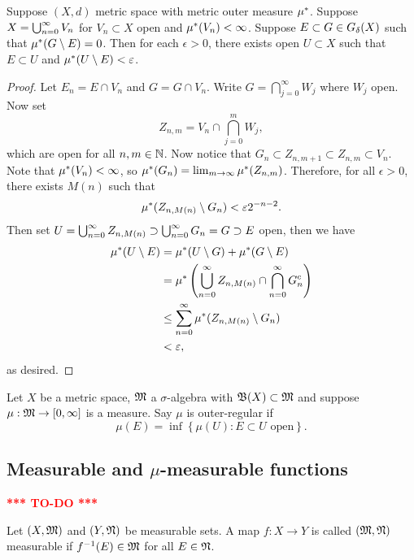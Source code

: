 \documentclass[a4paper]{article}
\begin{document}
\begin{lemma}
Suppose $(X, d)$ metric space with metric outer measure 
$\mu^*$. Suppose $X = \bigcup_{n=0}^\infty V_n$ for $V_n \subset X$ open and 
$\mu^*(V_n) < \infty$. Suppose $E \subset G \in G_\delta(X)$ such that 
$\mu^*(G \setminus E) = 0$. Then for each $\epsilon > 0$, 
there exists open $U \subset X$ such that $E \subset U$
and $\mu^*(U \setminus E) < \varepsilon$.  

\end{lemma}

\begin{proof}

Let $E_n = E \cap V_n$ and $G = G \cap V_n$. Write 
$G = \bigcap_{j=0}^\infty W_j$ where $W_j$ open. 
Now set 
\[
Z_{n, m} = V_n \cap \bigcap_{j=0}^m W_j,
\]
which are open for all $n, m \in \mathbb{N}$.
Now notice that $G_n \subset Z_{n, m+1} \subset Z_{n,m} 
\subset V_n$. Note that $\mu^*(V_n) < \infty$, so 
$\mu^*(G_n) = \lim_{m \to \infty} \mu^*(Z_{n, m})$. Therefore, 
for all $\epsilon > 0$, there exists $M(n)$ such that 
\[
\mu^*(Z_{n, M(n)} \setminus G_n) < \varepsilon 2^{-n-2}.
\]
Then set $U = \bigcup_{n=0}^\infty Z_{n, M(n)} \supset \bigcup_{n=0}^\infty G_n = G 
\supset E$ open, then we have 
\[
\begin{aligned}
\mu^*(U \setminus E) 
&= \mu^*(U \setminus G) + \mu^*(G \setminus E)  \\
&= \mu^* \left( \bigcup_{n=0}^\infty Z_{n, M(n)} \cap
\bigcap_{n=0}^\infty G_n^c \right) \\
&\leq \sum_{n=0}^\infty \mu^*(Z_{n, M(n)} \setminus G_n) \\
&< \varepsilon,
\end{aligned}
\]
as desired.

\end{proof}


\begin{defi}
  Let $X$ be a metric space, $\mathfrak{M}$ a $\sigma$-algebra
  with $\mathfrak{B}(X) \subset \mathfrak{M}$ and suppose $\mu: \mathfrak{M} \to [0, \infty]$
  is a measure. Say $\mu$ is outer-regular if 
  \[
  \mu(E) = \inf \left\{ \mu(U) : E \subset U \text{ open} \right\}.
  \]
\end{defi}


\subsection{Measurable and $\mu$-measurable functions}

\textcolor{red}{\textbf{*** TO-DO ***}}

\begin{defi}
  Let $(X, \mathfrak{M})$ and $(Y, \mathfrak{N})$ be measurable sets. A map 
  $f : X \to Y$ is called $(\mathfrak{M}, \mathfrak{N})$ measurable if $f^{-1}(E) 
  \in \mathfrak{M}$ for all $E \in \mathfrak{N}$.
\end{defi}
\end{document}
